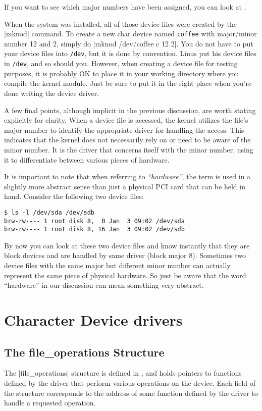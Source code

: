 \documentclass[10pt, oneside]{book}
\begin{document}
If you want to see which major numbers have been assigned, you can look at .

When the system was installed, all of those device files were created by the \sh|mknod| command.
To create a new char device named \verb|coffee| with major/minor number 12 and 2, simply do \sh|mknod /dev/coffee c 12 2|.
You do not have to put your device files into \verb|/dev|, but it is done by convention.
Linus put his device files in \verb|/dev|, and so should you.
However, when creating a device file for testing purposes, it is probably OK to place it in your working directory where you compile the kernel module.
Just be sure to put it in the right place when you're done writing the device driver.

A few final points, although implicit in the previous discussion, are worth stating explicitly for clarity.
When a device file is accessed, the kernel utilizes the file's major number to identify the appropriate driver for handling the access.
This indicates that the kernel does not necessarily rely on or need to be aware of the minor number.
It is the driver that concerns itself with the minor number, using it to differentiate between various pieces of hardware.

It is important to note that when referring to \emph{``hardware''},
the term is used in a slightly more abstract sense than just a physical PCI card that can be held in hand.
Consider the following two device files:

\begin{verbatim}
$ ls -l /dev/sda /dev/sdb
brw-rw---- 1 root disk 8,  0 Jan  3 09:02 /dev/sda
brw-rw---- 1 root disk 8, 16 Jan  3 09:02 /dev/sdb
\end{verbatim}

By now you can look at these two device files and know instantly that they are block devices and are handled by same driver (block major 8).
Sometimes two device files with the same major but different minor number can actually represent the same piece of physical hardware.
So just be aware that the word ``hardware'' in our discussion can mean something very abstract.

\section{Character Device drivers}
\label{sec:chardev}
\subsection{The file\_operations Structure}
\label{sec:file_operations}
The \cpp|file_operations| structure is defined in , and holds pointers to functions defined by the driver that perform various operations on the device.
Each field of the structure corresponds to the address of some function defined by the driver to handle a requested operation.
\end{document}
